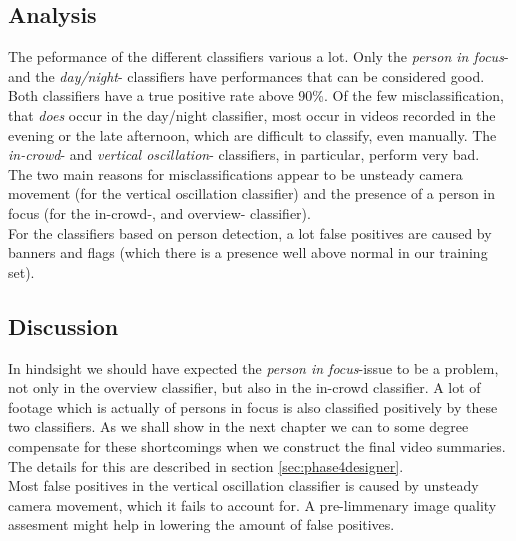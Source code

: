 \subsection{Analysis}
%
The peformance of the different classifiers various a lot. Only the \textit{person in focus}- and the \textit{day/night}- classifiers have performances that can be considered good. Both classifiers have a true positive rate above 90\%. Of the few misclassification, that \textit{does} occur in the day/night classifier, most occur in videos recorded in the evening or the late afternoon, which are difficult to classify, even manually. The \textit{in-crowd}- and \textit{vertical oscillation}- classifiers, in particular, perform very bad.\\
The two main reasons for misclassifications appear to be unsteady camera movement (for the vertical oscillation classifier) and the presence of a person in focus (for the in-crowd-, and overview- classifier).\\
For the classifiers based on person detection, a lot false positives are caused by banners and flags (which there is a presence well above normal in our training set).
%
\subsection{Discussion}\label{sec:phase2discussion}
%
In hindsight we should have expected the \textit{person in focus}-issue to be a problem, not only in the overview classifier, but also in the in-crowd classifier. A lot of footage which is actually of persons in focus is also classified positively by these two classifiers. As we shall show in the next chapter we can to some degree compensate for these shortcomings when we construct the final video summaries. The details for this are described in section \ref{sec:phase4designer}.\\
Most false positives in the vertical oscillation classifier is caused by unsteady camera movement, which it fails to account for. A pre-limmenary image quality assesment might help in lowering the amount of false positives.
%
